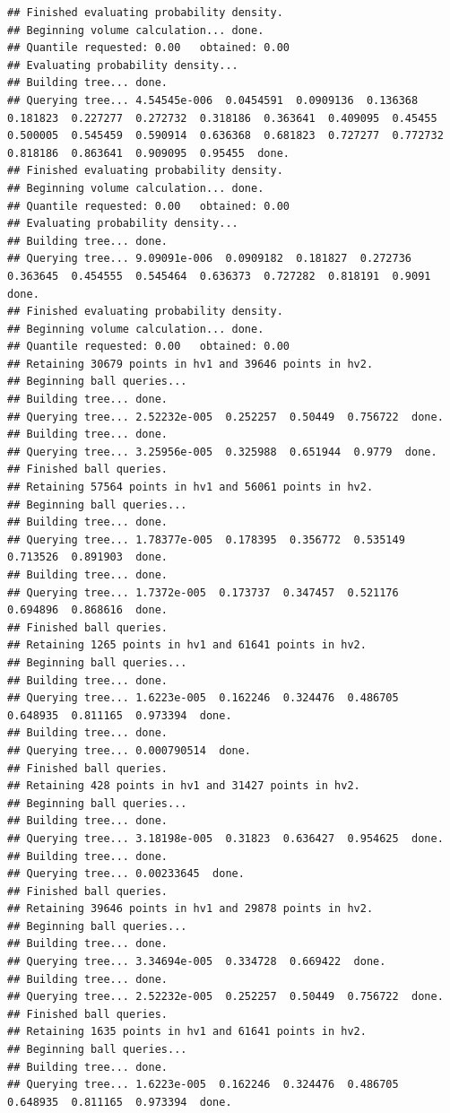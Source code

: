 \documentclass[12pt]{article}\usepackage[]{graphicx}\usepackage[]{color}
\makeatletter
\newenvironment{kframe}{%
 \def\at@end@of@kframe{}%
 \ifinner\ifhmode%
  \def\at@end@of@kframe{\end{minipage}}%
  \begin{minipage}{\columnwidth}%
 \fi\fi%
 \def\FrameCommand##1{\hskip\@totalleftmargin \hskip-\fboxsep
 \colorbox{shadecolor}{##1}\hskip-\fboxsep
     \hskip-\linewidth \hskip-\@totalleftmargin \hskip\columnwidth}%
 \MakeFramed {\advance\hsize-\width
   \@totalleftmargin\z@ \linewidth\hsize
   \@setminipage}}%
 {\par\unskip\endMakeFramed%
 \at@end@of@kframe}
\newenvironment{knitrout}{}{} %
\makeatother
\begin{document}
\begin{knitrout}
\begin{kframe}
\begin{verbatim}
## Finished evaluating probability density.
## Beginning volume calculation... done. 
## Quantile requested: 0.00   obtained: 0.00
## Evaluating probability density...
## Building tree... done.
## Querying tree... 4.54545e-006  0.0454591  0.0909136  0.136368  0.181823  0.227277  0.272732  0.318186  0.363641  0.409095  0.45455  0.500005  0.545459  0.590914  0.636368  0.681823  0.727277  0.772732  0.818186  0.863641  0.909095  0.95455  done.
## Finished evaluating probability density.
## Beginning volume calculation... done. 
## Quantile requested: 0.00   obtained: 0.00
## Evaluating probability density...
## Building tree... done.
## Querying tree... 9.09091e-006  0.0909182  0.181827  0.272736  0.363645  0.454555  0.545464  0.636373  0.727282  0.818191  0.9091  done.
## Finished evaluating probability density.
## Beginning volume calculation... done. 
## Quantile requested: 0.00   obtained: 0.00
## Retaining 30679 points in hv1 and 39646 points in hv2.
## Beginning ball queries... 
## Building tree... done.
## Querying tree... 2.52232e-005  0.252257  0.50449  0.756722  done.
## Building tree... done.
## Querying tree... 3.25956e-005  0.325988  0.651944  0.9779  done.
## Finished ball queries. 
## Retaining 57564 points in hv1 and 56061 points in hv2.
## Beginning ball queries... 
## Building tree... done.
## Querying tree... 1.78377e-005  0.178395  0.356772  0.535149  0.713526  0.891903  done.
## Building tree... done.
## Querying tree... 1.7372e-005  0.173737  0.347457  0.521176  0.694896  0.868616  done.
## Finished ball queries. 
## Retaining 1265 points in hv1 and 61641 points in hv2.
## Beginning ball queries... 
## Building tree... done.
## Querying tree... 1.6223e-005  0.162246  0.324476  0.486705  0.648935  0.811165  0.973394  done.
## Building tree... done.
## Querying tree... 0.000790514  done.
## Finished ball queries. 
## Retaining 428 points in hv1 and 31427 points in hv2.
## Beginning ball queries... 
## Building tree... done.
## Querying tree... 3.18198e-005  0.31823  0.636427  0.954625  done.
## Building tree... done.
## Querying tree... 0.00233645  done.
## Finished ball queries. 
## Retaining 39646 points in hv1 and 29878 points in hv2.
## Beginning ball queries... 
## Building tree... done.
## Querying tree... 3.34694e-005  0.334728  0.669422  done.
## Building tree... done.
## Querying tree... 2.52232e-005  0.252257  0.50449  0.756722  done.
## Finished ball queries. 
## Retaining 1635 points in hv1 and 61641 points in hv2.
## Beginning ball queries... 
## Building tree... done.
## Querying tree... 1.6223e-005  0.162246  0.324476  0.486705  0.648935  0.811165  0.973394  done.

\end{verbatim}
\end{kframe}
\end{knitrout}
\end{document}
